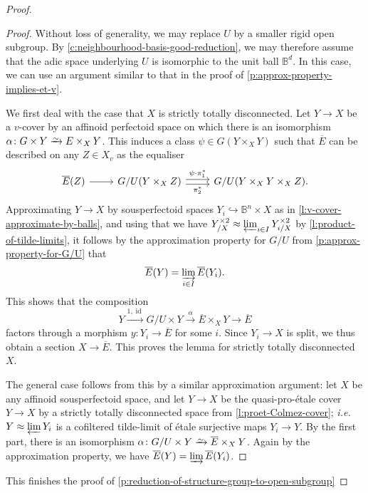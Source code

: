 \documentclass[11pt]{amsart}
\numberwithin{equation}{section}
\theoremstyle{definition}
\theoremstyle{remark}
\newcommand{\lra}{\longrightarrow}
\newcommand*{\lowsim}{\vbox to 0pt{\vss\hbox{$\scriptstyle\sim$}\vskip-2pt}}
\newcommand*{\isomarrow}{\xrightarrow{\lowsim}}
\newcommand{\B}{\mathbb{B}}
\newcommand{\id}{{\operatorname{id}}}
\begin{document}
\begin{proof}
                \begin{proof}
		  Without loss of generality, we may replace $U$ by a smaller rigid open subgroup. By \cref{c:neighbourhood-basis-good-reduction}, we may therefore assume that the adic space underlying $U$ is isomorphic to the unit ball $\B^d$. In this case, we can use an argument similar to that in the proof of \cref{p:approx-property-implies-et-v}.
		  
		We first deal with the case that $X$ is strictly totally disconnected. Let $Y\to X$ be a $v$-cover by an affinoid perfectoid space on which there is an isomorphism $\alpha\colon  G\times Y\isomarrow E\times_XY$. This induces a class $\psi\in G(Y\times_XY)$ such that $\overline{E}$ can be described on any $Z\in X_v$ as the equaliser
		\[\begin{tikzcd}
			\overline{E}(Z)& G/U(Y\times_XZ)&  G/U(Y\times_XY\times_XZ).
			\arrow["\psi\cdot\pi_1^{\ast}", shift left=1, from=1-2, to=1-3]
			\arrow["\pi_2^\ast"', shift right=1, from=1-2, to=1-3]
			\arrow[from=1-1, to=1-2]
		\end{tikzcd}\]
		Approximating $Y\to X$ by sousperfectoid spaces $Y_i\hookrightarrow \B^n\times X$ as in \cref{l:v-cover-approximate-by-balls}, and using that we have $Y_{/X}^{\times 2}\approx \varprojlim_{i\in I} Y_{i/X}^{\times 2}$ by \cref{l:product-of-tilde-limits}, it follows by the approximation property for $G/U$ from \cref{p:approx-property-for-G/U} that 
		\[ \overline{E}(Y)=\varinjlim_{i\in I} \overline{E}(Y_i).\]
		This shows that the composition
		\[ Y\xrightarrow{1,\id}G/U\times Y\overset{\alpha}\lra\overline{E}\times_XY\lra \overline{E}\]
		factors through a morphism $y\colon Y_i\to \overline{E}$ for some $i$. 
		Since $Y_i\to X$ is split, we thus obtain a section $X\to \overline{E}$.
		This proves the lemma for strictly totally disconnected $X$.
		
		The general case follows from this by a similar approximation argument: let $X$ be any affinoid sousperfectoid space, and let $Y\to X$ be the quasi-pro-\'etale cover $Y\to X$ by a strictly totally disconnected space from \cref{l:proet-Colmez-cover}; \textit{i.e.}~$Y\approx \varprojlim Y_i$ is a cofiltered tilde-limit of \'etale surjective maps $Y_i\to Y$. By the first part, there is an isomorphism $\alpha\colon G/U\times Y\isomarrow \overline{E}\times_XY$. Again by the approximation property, we have
		$\overline{E}(Y)=\varinjlim \overline{E}(Y_i)$.
	        \end{proof}
                
	This finishes the proof of \cref{p:reduction-of-structure-group-to-open-subgroup}
\end{proof}
\end{document}

